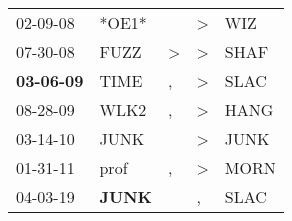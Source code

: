 \begin{supertabular}{p{0.07\textwidth}p{0.06\textwidth}p{0.02\textwidth}p{0.02\textwidth}p{0.06\textwidth}}
          02-09-08\textsuperscript{} &                            *OE1* &               &  \textgreater &   WIZ\textsuperscript{} \\
          07-30-08\textsuperscript{} &           FUZZ\textsuperscript{} &  \textgreater &  \textgreater &  SHAF\textsuperscript{} \\
 \textbf{03-06-09\textsuperscript{}} &           TIME\textsuperscript{} &             , &  \textgreater &  SLAC\textsuperscript{} \\
          08-28-09\textsuperscript{} &           WLK2\textsuperscript{} &             , &  \textgreater &  HANG\textsuperscript{} \\
          03-14-10\textsuperscript{} &           JUNK\textsuperscript{} &               &  \textgreater &  JUNK\textsuperscript{} \\
          01-31-11\textsuperscript{} &           prof\textsuperscript{} &             , &  \textgreater &  MORN\textsuperscript{} \\
          04-03-19\textsuperscript{} &  \textbf{JUNK\textsuperscript{}} &               &             , &  SLAC\textsuperscript{} \\
\end{supertabular}
